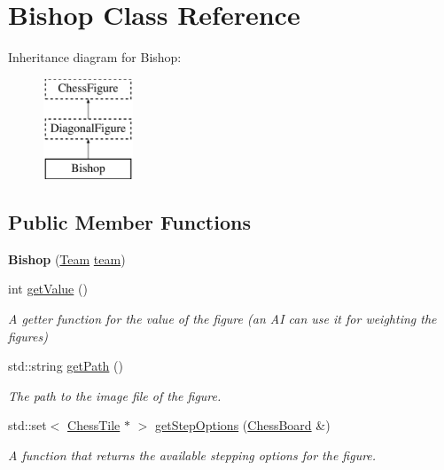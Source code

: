 \hypertarget{classBishop}{}\section{Bishop Class Reference}
\label{classBishop}
Inheritance diagram for Bishop\+:\begin{figure}[H]
\begin{center}
\leavevmode
\includegraphics[height=3.000000cm]{classBishop}
\end{center}
\end{figure}
\subsection*{Public Member Functions}
\begin{DoxyCompactItemize}
\item 
\mbox{\label{classBishop_a8e41c7d03936f10f1d7f78bb9b3a8b34}} 
{\bfseries Bishop} (\mbox{\hyperlink{classChessFigure_a62f54318c1f28a08e6a6a2707f697a1d}{Team}} \mbox{\hyperlink{classChessFigure_ac7d0751a28c94d49927b9524390d1261}{team}})
\item 
\mbox{\label{classBishop_a7255af36858df3d5349a9ab815afa9a7}} 
int \mbox{\hyperlink{classBishop_a7255af36858df3d5349a9ab815afa9a7}{get\+Value}} ()
\begin{DoxyCompactList}\small\item\em A getter function for the value of the figure (an AI can use it for weighting the figures) \end{DoxyCompactList}\item 
\mbox{\label{classBishop_af2345c750c316768d046b064e6328b40}} 
std\+::string \mbox{\hyperlink{classBishop_af2345c750c316768d046b064e6328b40}{get\+Path}} ()
\begin{DoxyCompactList}\small\item\em The path to the image file of the figure. \end{DoxyCompactList}\item 
std\+::set$<$ \mbox{\hyperlink{classChessTile}{Chess\+Tile}} $\ast$ $>$ \mbox{\hyperlink{classBishop_a5da898db86a3025a5064d2d6ea2f1148}{get\+Step\+Options}} (\mbox{\hyperlink{classChessBoard}{Chess\+Board}} \&)
\begin{DoxyCompactList}\small\item\em A function that returns the available stepping options for the figure. \end{DoxyCompactList}\end{DoxyCompactItemize}
